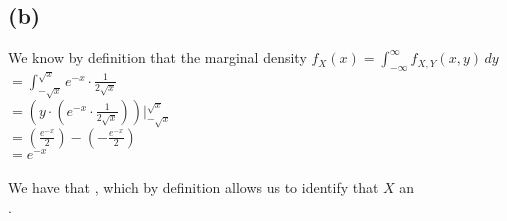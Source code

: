 \documentclass{article}
\begin{document}
{\subsection*{(b)}
We know by definition that the marginal density $f_X (x) = \int_{-\infty}^{\infty} f_{X, Y} (x, y) \,dy$ \\ 
$= \int_{-\sqrt{x}}^{\sqrt{x}} e^{-x} \cdot \frac{1}{2\sqrt{x}}$ \\ 
$= (y \cdot (e^{-x} \cdot \frac{1}{2\sqrt{x}})) |_{-\sqrt{x}}^{\sqrt{x}}$ \\ 
$= (\frac{e^{-x}}{2}) - (-\frac{e^{-x}}{2})$ \\ 
$= e^{-x}$ \\ \\
We have that , which by definition allows us to identify that $X$ an \\ .

}
\end{document}
